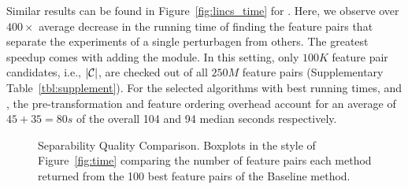 Similar results can be found in Figure~\ref{fig:lincs_time} for \lincs. Here, we observe over $400\times$ average decrease in the running time of finding the \topk feature pairs that separate the \lincs experiments of a single perturbagen from others. The greatest speedup comes with adding the \sampling module. In this setting, only $100K$ feature pair candidates, i.e., $|{\mathcal{C}}|$, are checked out of all $250M$ feature pairs (Supplementary Table~\ref{tbl:supplement}). For the selected algorithms with best running times, \horiz and \vertic, the pre-transformation and feature ordering overhead account for an average of $45+35=80s$ of the overall 104 and 94 median seconds respectively.



\begin{figure}[h]
\centering %
\vspace{-5mm}
\vspace{-5mm}
\caption{Separability Quality Comparison. Boxplots in the style of Figure~\ref{fig:time} comparing the number of feature pairs each method returned from the 100 best feature pairs of the Baseline method.}
\vspace{-5mm}
\label{fig:separability}
\end{figure}


